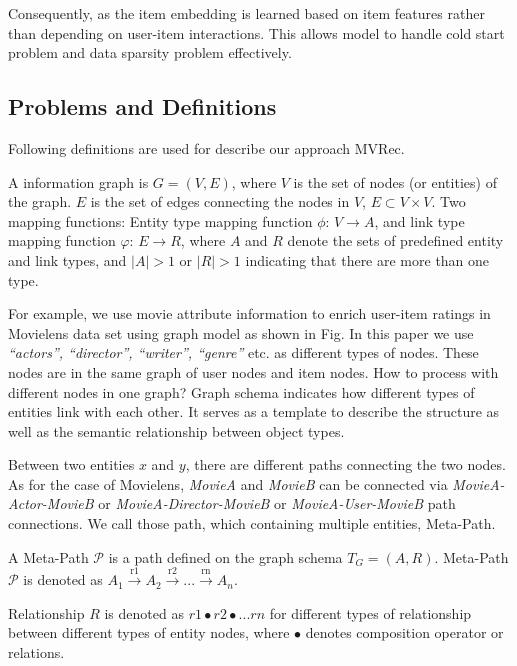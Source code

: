 Consequently, as the item embedding is learned based on item features rather than depending on user-item interactions. This allows model to handle cold start problem and data sparsity problem effectively. 

\subsection{Problems and Definitions}\label{3PD}
Following definitions are used for describe our approach MVRec.

\begin{definition}
A information graph is $G = (V,E)$, where $V$ is the set of nodes (or entities) of the graph. $E$ is the set of edges connecting the nodes in $V$, $E \subset V \times V$. \newline
Two mapping functions: Entity type mapping function $\phi$: $V \rightarrow A$, and link type mapping function $\varphi$: $E \rightarrow R$, where $A$ and $R$ denote the sets of predefined entity and link types, and $|A| > 1$ or $|R| > 1$ indicating that there are more than one type.
\end{definition}

For example, we use movie attribute information to enrich user-item ratings in Movielens data set using graph model as shown in Fig. %
In this paper we use \textit{``actors'', ``director'', ``writer'', ``genre''} etc. as different types of nodes. These nodes are in the same graph of user nodes and item nodes. How to process with different nodes in one graph? Graph schema indicates how different types of entities link with each other. It serves as a template to describe the structure as well as the semantic relationship between object types.

Between two entities $x$ and $y$, there are different paths connecting the two nodes. As for the case of Movielens, \textit{MovieA} and \textit{MovieB} can be connected via \textit{MovieA-Actor-MovieB} or \textit{MovieA-Director-MovieB} or \textit{MovieA-User-MovieB} path connections. We call those path, which containing multiple entities, Meta-Path.

\begin{definition}\label{def:metaPath}
A Meta-Path $\mathcal{P}$ is a path defined on the  graph schema $T_G = (A, R)$. \newline
Meta-Path $\mathcal{P}$ is denoted as $A_1 \xrightarrow{\text{r1}} A_2 \xrightarrow{\text{r2}} ... \xrightarrow{\text{rn}} A_n$. 

Relationship $R$ is denoted as $r1 \bullet r2 \bullet ... rn$ for different types of relationship between different types of entity nodes, where $\bullet $ denotes composition operator or relations.
\end{definition}

